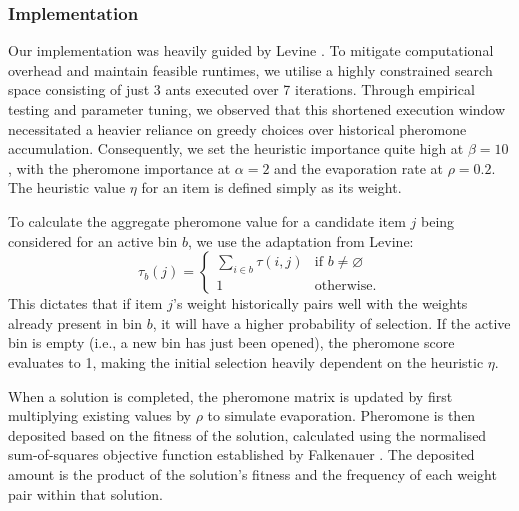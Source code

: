 \documentclass[11pt]{article}
\begin{document}
\subsubsection{Implementation}
Our implementation was heavily guided by Levine \cite{levine}. To mitigate 
computational overhead and maintain feasible runtimes, we utilise a highly 
constrained search space consisting of just 3 ants executed over 7 iterations. 
Through empirical testing and parameter tuning, we observed that this shortened 
execution window necessitated a heavier reliance on greedy choices over 
historical pheromone accumulation. Consequently, we set the heuristic 
importance quite high at $\beta = 10$, with the pheromone importance at 
$\alpha = 2$ and the evaporation rate at $\rho = 0.2$. The heuristic value 
$\eta$ for an item is defined simply as its weight.

To calculate the aggregate pheromone value for a candidate item $j$ being 
considered for an active bin $b$, we use the adaptation from Levine:
$$\tau_b(j) = \begin{cases} \sum_{i \in b} \tau(i,j) & \text{if } b \neq \varnothing \\ 1 & \text{otherwise}. \end{cases}$$
This dictates that if item $j$'s weight historically pairs well with the 
weights already present in bin $b$, it will have a higher probability of 
selection. If the active bin is empty (i.e., a new bin has just been opened), 
the pheromone score evaluates to 1, making the initial selection heavily 
dependent on the heuristic $\eta$.

When a solution is completed, the pheromone matrix is updated by first 
multiplying existing values by $\rho$ to simulate evaporation. 
Pheromone is then deposited based on the fitness of the solution, calculated 
using the normalised sum-of-squares objective function established by 
Falkenauer \cite{gga}. The deposited amount is the product of the solution's 
fitness and the frequency of each weight pair within that solution.
\end{document}
